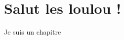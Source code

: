 \newcommand{\nationclass}{book}






\maketitle
\tableofcontents 

\chapter{Salut les loulou !}
Je suis un chapitre



